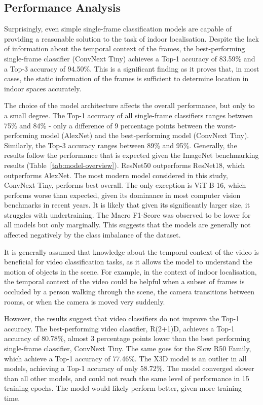 \documentclass[a4paper]{article}
\begin{document}
\subsection{Performance Analysis} %
\label{sub:performance}

Surprisingly, even simple single-frame classification models are capable of
providing a reasonable solution to the task of indoor localisation. Despite the
lack of information about the temporal context of the frames, the
best-performing single-frame classifier (ConvNext Tiny) achieves a Top-1
accuracy of 83.59\% and a Top-3 accuracy of 94.50\%. This is a significant
finding as it proves that, in most cases, the static information of the frames is
sufficient to determine location in indoor spaces accurately.

The choice of the model architecture affects the overall performance, but only
to a small degree. The Top-1 accuracy of all single-frame classifiers ranges
between 75\% and 84\% - only a difference of 9 percentage points between the
worst-performing model (AlexNet) and the best-performing model (ConvNext Tiny).
Similarly, the Top-3 accuracy ranges between 89\% and 95\%. Generally, the
results follow the performance that is expected given the ImageNet benchmarking
results (Table~\ref{tab:model-overview}). ResNet50 outperforms ResNet18, which
outperforms AlexNet. The most modern model considered in this study, ConvNext
Tiny, performs best overall. The only exception is ViT B-16, which performs
worse than expected, given its dominance in most computer vision benchmarks in
recent years. It is likely that given its significantly larger size, it
struggles with undertraining. The Macro F1-Score was observed to be lower for
all models but only marginally. This suggests that the models are generally not
affected negatively by the class imbalance of the dataset.

It is generally assumed that knowledge about the temporal context of the video
is beneficial for video classification tasks, as it allows the model to
understand the motion of objects in the scene. For example, in the context of
indoor localisation, the temporal context of the video could be helpful when a
subset of frames is occluded by a person walking through the scene, the camera
transitions between rooms, or when the camera is moved very suddenly.

However, the results suggest that video classifiers do not improve the Top-1
accuracy. The best-performing video classifier, R(2+1)D, achieves a Top-1
accuracy of 80.78\%, almost 3 percentage points lower than the best performing
single-frame classifier, ConvNext Tiny. The same goes for the Slow R50 Family,
which achieve a Top-1 accuracy of 77.46\%. The X3D model is an outlier in all
models, achieving a Top-1 accuracy of only 58.72\%. The model converged slower
than all other models, and could not reach the same level of performance in 15
training epochs. The model would likely perform better, given more training
time.
\end{document}
